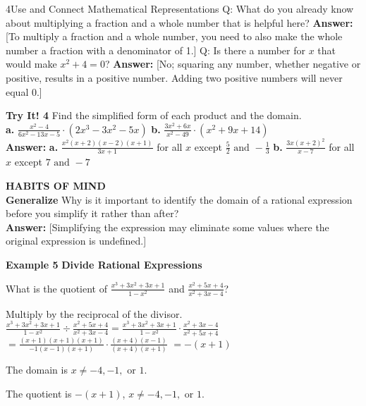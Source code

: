\documentclass{article}
\newenvironment{concept-box}{}{}
\newenvironment{example}[1]{\textbf{Example #1}}{}
\newenvironment{tryit}[1]{\textbf{Try It! #1}}{}
\newenvironment{te-addendum}[2]{\textbf{TE (#1 - #2)}}{}
\newcommand{\answer}[1]{\textbf{Answer:} #1}
\begin{document}
\begin{te-addendum}{4}{Use and Connect Mathematical Representations}
Q: What do you already know about multiplying a fraction and a whole number that is helpful here?
\answer{[To multiply a fraction and a whole number, you need to also make the whole number a fraction with a denominator of 1.]}
Q: Is there a number for $x$ that would make $x^2 + 4 = 0$?
\answer{[No; squaring any number, whether negative or positive, results in a positive number. Adding two positive numbers will never equal 0.]}
\end{te-addendum}

\begin{tryit}{4}
Find the simplified form of each product and the domain. \\
\textbf{a.} $\frac{x^2 - 4}{6x^2 - 13x - 5} \cdot (2x^3 - 3x^2 - 5x)$ \qquad \textbf{b.} $\frac{3x^2 + 6x}{x^2 - 49} \cdot (x^2 + 9x + 14)$ \\
\answer{\textbf{a.} $\frac{x^2(x+2)(x-2)(x+1)}{3x+1}$ for all $x$ except $\frac{5}{2} \text{ and } -\frac{1}{3}$ \qquad \textbf{b.} $\frac{3x(x+2)^2}{x-7}$ for all $x$ except $7 \text{ and } -7$}
\end{tryit}

\begin{concept-box}
\textbf{HABITS OF MIND} \\
\textbf{Generalize} Why is it important to identify the domain of a rational expression before you simplify it rather than after? \\
\answer{[Simplifying the expression may eliminate some values where the original expression is undefined.]}
\end{concept-box}

\begin{example}{5}
\textbf{Divide Rational Expressions}

What is the quotient of $\frac{x^3 + 3x^2 + 3x + 1}{1 - x^2}$ and $\frac{x^2 + 5x + 4}{x^2 + 3x - 4}$?

Multiply by the reciprocal of the divisor.
$\frac{x^3 + 3x^2 + 3x + 1}{1 - x^2} \div \frac{x^2 + 5x + 4}{x^2 + 3x - 4} = \frac{x^3 + 3x^2 + 3x + 1}{1 - x^2} \cdot \frac{x^2 + 3x - 4}{x^2 + 5x + 4}$
$= \frac{(x+1)(x+1)(x+1)}{-1(x-1)(x+1)} \cdot \frac{(x+4)(x-1)}{(x+4)(x+1)}$
$= -(x+1)$

The domain is $x \neq -4, -1, \text{ or } 1$.

The quotient is $-(x+1)$, $x \neq -4, -1, \text{ or } 1$.
\end{example}
\end{document}

